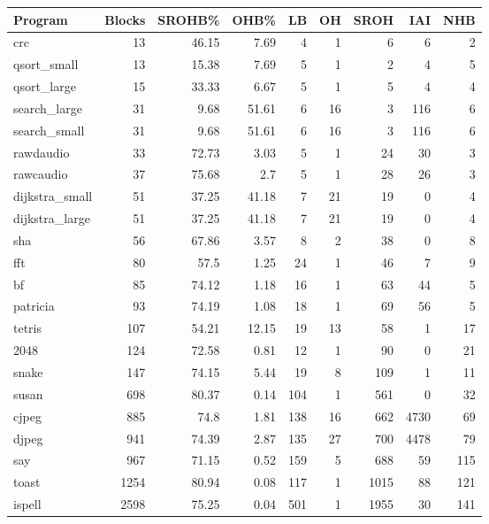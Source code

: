 \begin{tabular}{lrrrrrrrr}
\hline
 Program        &   Blocks &   SROHB\% &   OHB\% &   LB &   OH &   SROH &   IAI &   NHB \\
\hline
 crc            &       13 &    46.15 &   7.69 &    4 &    1 &      6 &     6 &     2 \\
 qsort\_small    &       13 &    15.38 &   7.69 &    5 &    1 &      2 &     4 &     5 \\
 qsort\_large    &       15 &    33.33 &   6.67 &    5 &    1 &      5 &     4 &     4 \\
 search\_large   &       31 &     9.68 &  51.61 &    6 &   16 &      3 &   116 &     6 \\
 search\_small   &       31 &     9.68 &  51.61 &    6 &   16 &      3 &   116 &     6 \\
 rawdaudio      &       33 &    72.73 &   3.03 &    5 &    1 &     24 &    30 &     3 \\
 rawcaudio      &       37 &    75.68 &   2.7  &    5 &    1 &     28 &    26 &     3 \\
 dijkstra\_small &       51 &    37.25 &  41.18 &    7 &   21 &     19 &     0 &     4 \\
 dijkstra\_large &       51 &    37.25 &  41.18 &    7 &   21 &     19 &     0 &     4 \\
 sha            &       56 &    67.86 &   3.57 &    8 &    2 &     38 &     0 &     8 \\
 fft            &       80 &    57.5  &   1.25 &   24 &    1 &     46 &     7 &     9 \\
 bf             &       85 &    74.12 &   1.18 &   16 &    1 &     63 &    44 &     5 \\
 patricia       &       93 &    74.19 &   1.08 &   18 &    1 &     69 &    56 &     5 \\
 tetris         &      107 &    54.21 &  12.15 &   19 &   13 &     58 &     1 &    17 \\
 2048           &      124 &    72.58 &   0.81 &   12 &    1 &     90 &     0 &    21 \\
 snake          &      147 &    74.15 &   5.44 &   19 &    8 &    109 &     1 &    11 \\
 susan          &      698 &    80.37 &   0.14 &  104 &    1 &    561 &     0 &    32 \\
 cjpeg          &      885 &    74.8  &   1.81 &  138 &   16 &    662 &  4730 &    69 \\
 djpeg          &      941 &    74.39 &   2.87 &  135 &   27 &    700 &  4478 &    79 \\
 say            &      967 &    71.15 &   0.52 &  159 &    5 &    688 &    59 &   115 \\
 toast          &     1254 &    80.94 &   0.08 &  117 &    1 &   1015 &    88 &   121 \\
 ispell         &     2598 &    75.25 &   0.04 &  501 &    1 &   1955 &    30 &   141 \\
\hline
\end{tabular}

